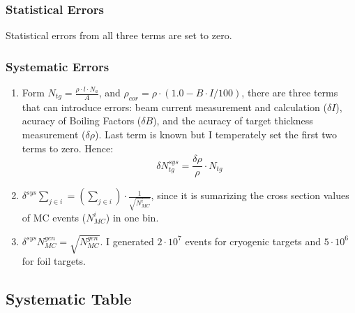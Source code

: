 \subsubsection{Statistical Errors}
 Statistical errors from all three terms are set to zero.

\subsubsection{Systematic Errors}

\begin{enumerate}


\item Form $N_{tg} = \frac{\rho\cdot l \cdot N_{a}}{A}$, and $\rho_{cor} = \rho \cdot (1.0 - B \cdot I /100)$, there are three terms that can introduce errors: beam current measurement and calculation ($\delta I$), acuracy of Boiling Factors ($\delta B$), and the acuracy of target thickness measurement ($\delta \rho$). Last term is known but I temperately set the first two terms to zero. Hence:
 \begin{equation}
    \delta N^{sys}_{tg} = \frac{\delta\rho}{\rho} \cdot N_{tg}
 \end{equation} 

\item $\delta^{sys}\sum_{j\in i} = (\sum_{j\in i})\cdot\frac{1}{\sqrt{N_{MC}^{i}}}$, since it is sumarizing the cross section values of MC events ($N_{MC}^{i}$) in one bin.

\item $\delta^{sys} N_{MC}^{gen} = \sqrt{N_{MC}^{gen}}$. I generated $2\cdot 10^{7}$ events for cryogenic targets and $5\cdot 10^{6}$ for foil targets.

\end{enumerate}

\subsection{Systematic Table}
 
